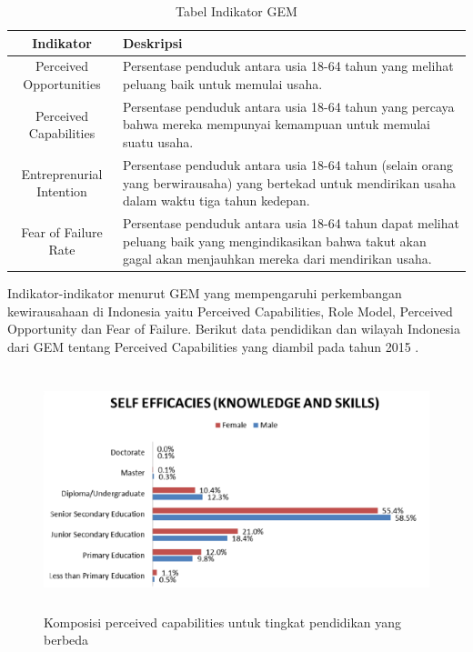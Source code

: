 \begin{table}[H]
\centering
\caption{Tabel Indikator GEM}
\begin{tabular}{|c|p{8cm}|}
\hline
Indikator & Deskripsi\\
\hline
Perceived Opportunities & Persentase penduduk antara usia 18-64 tahun yang melihat peluang baik untuk memulai usaha. \\
\hline
Perceived Capabilities & Persentase penduduk antara usia 18-64 tahun yang percaya bahwa mereka mempunyai kemampuan untuk memulai suatu usaha. \\
\hline
Entreprenurial Intention & Persentase penduduk antara usia 18-64 tahun (selain orang yang berwirausaha) yang bertekad untuk mendirikan usaha dalam waktu tiga tahun kedepan.\\
\hline
Fear of Failure Rate & Persentase penduduk antara usia 18-64 tahun dapat melihat peluang baik yang mengindikasikan bahwa takut akan gagal akan menjauhkan mereka dari mendirikan usaha. \\
\hline
\end{tabular}
\label{tabelindikator}
\end{table}



Indikator-indikator menurut GEM yang mempengaruhi perkembangan kewirausahaan di Indonesia yaitu Perceived Capabilities, Role Model, Perceived Opportunity dan Fear of Failure. Berikut data pendidikan dan wilayah Indonesia dari GEM tentang Perceived Capabilities yang diambil pada tahun 2015 \cite{dataGEM}.


\begin{figure} [H]
	\centering  
	\includegraphics[width=14cm, height=7cm]{PCPendidikan} 
	\caption[Komposisi perceived capabilities untuk tingkat pendidikan yang berbeda]{Komposisi perceived capabilities untuk tingkat pendidikan yang berbeda} 
	\label{fig:PCPendidikan} 
\end{figure}

